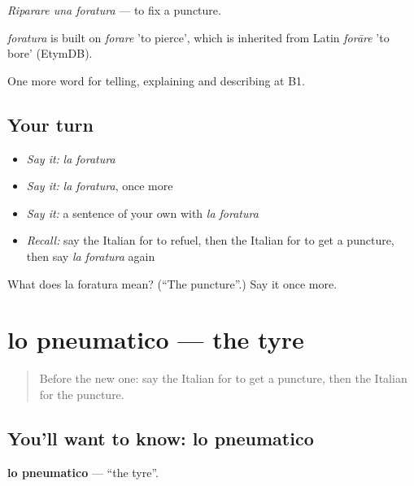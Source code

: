 \emph{Riparare una foratura} — to fix a puncture.

\begin{cousinweb}
\emph{foratura} is built on \emph{forare} 'to pierce', which is inherited from Latin \emph{forāre} 'to bore' (EtymDB).
\end{cousinweb}

\begin{grammarlens}[title={What you've built}]
One more word for telling, explaining and describing at B1.
\end{grammarlens}

\subsection*{Your turn}
\begin{itemize}
\raggedright
  \item \emph{Say it:} \emph{la foratura}
  \item \emph{Say it:} \emph{la foratura}, once more
  \item \emph{Say it:} a sentence of your own with \emph{la foratura}
  \item \emph{Recall:} say the Italian for to refuel, then the Italian for to get a puncture, then say \emph{la foratura} again
\end{itemize}

\begin{tcolorbox}[breakable,colback=teal!4,colframe=teal!35!black,title={Before you move on}]
What does la foratura mean? (\textquotedblleft{}The puncture\textquotedblright{}.) Say it once more.
\end{tcolorbox}
\section[lo pneumatico]{lo pneumatico — the tyre}

\label{lesson:IT-C409-pneumatico}



\begin{quote}
Before the new one: say the Italian for to get a puncture, then the Italian for the puncture.
\end{quote}

\subsection*{You'll want to know: lo pneumatico}
\textbf{lo pneumatico} — \textquotedblleft{}the tyre\textquotedblright{}.

